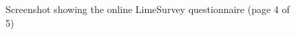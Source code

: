 \begin{figure}
\ContinuedFloat
 \centering
 \caption[Screenshot showing the online questionnaire (page 4 of 5)]{Screenshot showing the online LimeSurvey questionnaire (page 4 of 5)}
 \label{appendix:appendicies:developer-suvery-one-page-004}
\end{figure}


